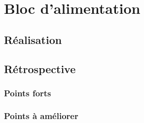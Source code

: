 \chapter{Bloc d'alimentation}
\label{chap:alimentation}

\section{Réalisation}



\section{Rétrospective}

\subsection{Points forts}



\subsection{Points à améliorer}
